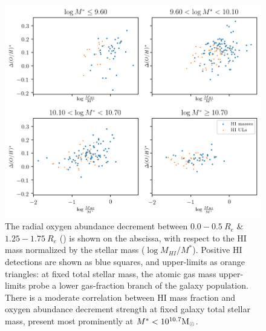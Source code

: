 \begin{figure}
    \centering
    \includegraphics[width=\textwidth]{hifrac_dec01_subplotmstar}
    \caption[The correlation between radial metallicity decrement and \hifrac, separated by total galaxy stellar mass.]{The radial oxygen abundance decrement between $0.0-0.5 ~ R_e$ \& $1.25-1.75 ~ R_e$ (\metdec) is shown on the abscissa, with respect to the HI mass normalized by the stellar mass ($\log M_{HI} / M^*$). Positive HI detections are shown as blue squares, and upper-limits as orange triangles: at fixed total stellar mass, the atomic gas mass upper-limits probe a lower gas-fraction branch of the galaxy population. There is a moderate correlation between HI mass fraction and oxygen abundance decrement strength at fixed galaxy total stellar mass, present most prominently at $M^* < 10^{10.7} {\rm M_{\odot}}$.}
    \label{fig:hifrac_dec01_subplotmstar}
\end{figure}

